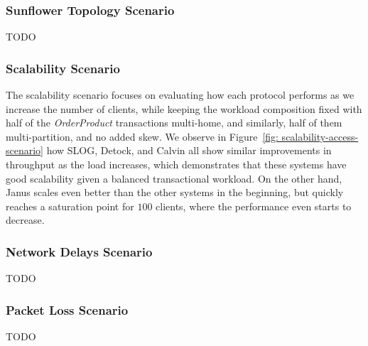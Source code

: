 \subsubsection{Sunflower Topology Scenario}
TODO

\subsubsection{Scalability Scenario}
The scalability scenario focuses on evaluating how each protocol performs as we increase the number of clients, while keeping the workload composition fixed with half of the \textit{OrderProduct} transactions multi-home, and similarly, half of them multi-partition, and no added skew. We observe in Figure~\ref{fig: scalability-access-scenario} how SLOG, Detock, and Calvin all show similar improvements in throughput as the load increases, which demonstrates that these systems have good scalability given a balanced transactional workload. On the other hand, Janus scales even better than the other systems in the beginning, but quickly reaches a saturation point for $100$ clients, where the performance even starts to decrease.

\subsubsection{Network Delays Scenario}
TODO

\subsubsection{Packet Loss Scenario}
TODO





